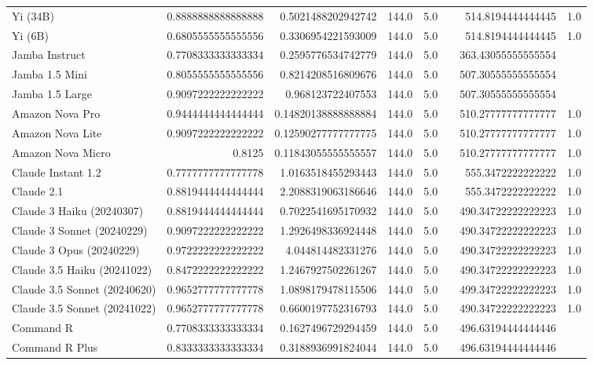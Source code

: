 \begin{table}[htp]
{\begin{tabular}{lrrrrrrr}
Yi (34B) & 0.8888888888888888 & 0.5021488202942742 & 144.0 & 5.0 &  & 514.8194444444445 & 1.0 \\
Yi (6B) & 0.6805555555555556 & 0.3306954221593009 & 144.0 & 5.0 &  & 514.8194444444445 & 1.0 \\
Jamba Instruct & 0.7708333333333334 & 0.2595776534742779 & 144.0 & 5.0 &  & 363.43055555555554 &  \\
Jamba 1.5 Mini & 0.8055555555555556 & 0.8214208516809676 & 144.0 & 5.0 &  & 507.30555555555554 &  \\
Jamba 1.5 Large & 0.9097222222222222 & 0.968123722407553 & 144.0 & 5.0 &  & 507.30555555555554 &  \\
Amazon Nova Pro & 0.9444444444444444 & 0.14820138888888884 & 144.0 & 5.0 &  & 510.27777777777777 & 1.0 \\
Amazon Nova Lite & 0.9097222222222222 & 0.12590277777777775 & 144.0 & 5.0 &  & 510.27777777777777 & 1.0 \\
Amazon Nova Micro & 0.8125 & 0.11843055555555557 & 144.0 & 5.0 &  & 510.27777777777777 & 1.0 \\
Claude Instant 1.2 & 0.7777777777777778 & 1.0163518455293443 & 144.0 & 5.0 &  & 555.3472222222222 & 1.0 \\
Claude 2.1 & 0.8819444444444444 & 2.2088319063186646 & 144.0 & 5.0 &  & 555.3472222222222 & 1.0 \\
Claude 3 Haiku (20240307) & 0.8819444444444444 & 0.7022541695170932 & 144.0 & 5.0 &  & 490.34722222222223 & 1.0 \\
Claude 3 Sonnet (20240229) & 0.9097222222222222 & 1.2926498336924448 & 144.0 & 5.0 &  & 490.34722222222223 & 1.0 \\
Claude 3 Opus (20240229) & 0.9722222222222222 & 4.044814482331276 & 144.0 & 5.0 &  & 490.34722222222223 & 1.0 \\
Claude 3.5 Haiku (20241022) & 0.8472222222222222 & 1.2467927502261267 & 144.0 & 5.0 &  & 490.34722222222223 & 1.0 \\
Claude 3.5 Sonnet (20240620) & 0.9652777777777778 & 1.0898179478115506 & 144.0 & 5.0 &  & 499.34722222222223 & 1.0 \\
Claude 3.5 Sonnet (20241022) & 0.9652777777777778 & 0.6600197752316793 & 144.0 & 5.0 &  & 490.34722222222223 & 1.0 \\
Command R & 0.7708333333333334 & 0.1627496729294459 & 144.0 & 5.0 &  & 496.63194444444446 &  \\
Command R Plus & 0.8333333333333334 & 0.3188936991824044 & 144.0 & 5.0 &  & 496.63194444444446 &  \\

\end{tabular}}
\end{table}
